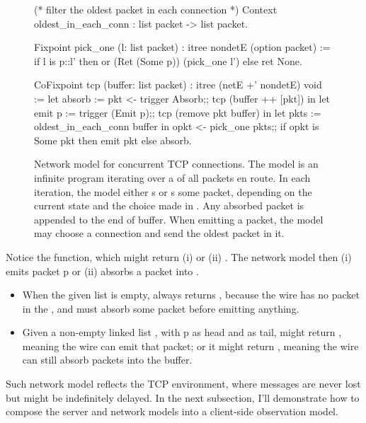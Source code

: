 \begin{figure}
\begin{coq}
(* filter the oldest packet in each connection *)
Context oldest_in_each_conn : list packet -> list packet.

Fixpoint pick_one (l: list packet) : itree nondetE (option packet) :=
  if l is p::l'
  then or (Ret (Some p)) (pick_one l')
  else ret None.

CoFixpoint tcp (buffer: list packet) : itree (netE +' nondetE) void :=
  let absorb := pkt <- trigger Absorb;;
                tcp (buffer ++ [pkt])      in
  let emit p := trigger (Emit p);;
                tcp (remove pkt buffer)    in
  let pkts   := oldest_in_each_conn buffer in
  opkt <- pick_one pkts;;
  if opkt is Some pkt
  then emit pkt
  else absorb.
\end{coq}
\caption[Network model for concurrent TCP connections]{Network model for
  concurrent TCP connections.  The model is an infinite program iterating over a
   of all packets en route.  In each iteration, the model either
  s or s some packet, depending on the current
   state and the choice made in .  Any absorbed packet
  is appended to the end of buffer.  When emitting a packet, the model may
  choose a connection and send the oldest packet in it.}
\label{fig:tcp-model}
\end{figure}

Notice the  function, which might return (i)  or (ii)
.  The network model then (i) emits packet \ilc p or (ii) absorbs a
packet into .

\begin{itemize}
\item When the given list  is empty,  always returns
  , because the wire has no packet in the , and must
  absorb some packet before emitting anything.
\item Given a non-empty linked list , with \ilc p as head and
   as tail,  might return , meaning the wire
  can emit that packet; or it might return , meaning the wire can
  still absorb packets into the buffer.
\end{itemize}

Such network model reflects the TCP environment, where messages are never lost
but might be indefinitely delayed.  In the next subsection, I'll demonstrate how
to compose the server and network models into a client-side observation model.

